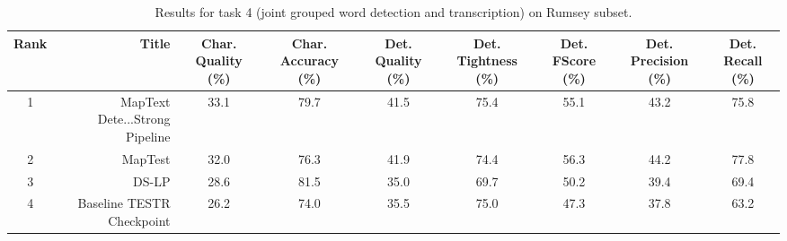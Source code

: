 \begin{table}
\caption{Results for task 4 (joint grouped word detection and transcription) on Rumsey subset.}
\begin{tabular}{crccccccc}
\toprule
Rank & Title & Char. Quality (\%) & Char. Accuracy (\%) & Det. Quality (\%) & Det. Tightness (\%) & Det. FScore (\%) & Det. Precision (\%) & Det. Recall (\%) \\
\midrule
1 & MapText Dete...Strong Pipeline & 33.1 & 79.7 & 41.5 & 75.4 & 55.1 & 43.2 & 75.8 \\
2 & MapTest & 32.0 & 76.3 & 41.9 & 74.4 & 56.3 & 44.2 & 77.8 \\
3 & DS-LP & 28.6 & 81.5 & 35.0 & 69.7 & 50.2 & 39.4 & 69.4 \\
4 & Baseline TESTR Checkpoint & 26.2 & 74.0 & 35.5 & 75.0 & 47.3 & 37.8 & 63.2 \\
\bottomrule
\end{tabular}
\end{table}
